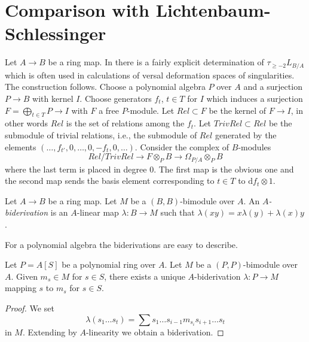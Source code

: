 \section{Comparison with Lichtenbaum-Schlessinger}
\label{section-compare-higher}

\noindent
Let $A \to B$ be a ring map. In \cite{Lichtenbaum-Schlessinger}
there is a fairly explicit determination of $\tau_{\geq -2}L_{B/A}$
which is often used in calculations of versal deformation spaces of
singularities. The construction follows.
Choose a polynomial algebra $P$ over $A$
and a surjection $P \to B$ with kernel $I$. Choose generators
$f_t$, $t \in T$ for $I$ which induces a surjection
$F = \bigoplus_{t \in T} P \to I$ with $F$ a free $P$-module.
Let $Rel \subset F$ be the kernel of $F \to I$, in other words
$Rel$ is the set of relations among the $f_t$. Let $TrivRel \subset Rel$
be the submodule of trivial relations, i.e., the submodule of $Rel$
generated by the elements $(\ldots, f_{t'}, 0, \ldots, 0, -f_t, 0, \ldots)$.
Consider the complex of $B$-modules
\begin{equation}
\label{equation-lichtenbaum-schlessinger}
Rel/TrivRel \longrightarrow
F \otimes_P B \longrightarrow
\Omega_{P/A} \otimes_P B
\end{equation}
where the last term is placed in degree $0$. The first map is the obvious
one and the second map sends the basis element corresponding to $t \in T$
to $\text{d}f_t \otimes 1$.

\begin{definition}
\label{definition-biderivation}
Let $A \to B$ be a ring map. Let $M$ be a $(B, B)$-bimodule
over $A$. An {\it $A$-biderivation} is an $A$-linear map $\lambda : B \to M$
such that $\lambda(xy) = x\lambda(y) + \lambda(x)y$.
\end{definition}

\noindent
For a polynomial algebra the biderivations are easy to describe.

\begin{lemma}
\label{lemma-polynomial-ring-unique}
Let $P = A[S]$ be a polynomial ring over $A$. Let $M$ be a $(P, P)$-bimodule
over $A$. Given $m_s \in M$ for $s \in S$, there exists a unique
$A$-biderivation $\lambda : P \to M$ mapping $s$ to $m_s$ for $s \in S$.
\end{lemma}

\begin{proof}
We set
$$
\lambda(s_1 \ldots s_t) =
\sum s_1 \ldots s_{i - 1} m_{s_i} s_{i + 1} \ldots s_t
$$
in $M$. Extending by $A$-linearity we obtain a biderivation.
\end{proof}

